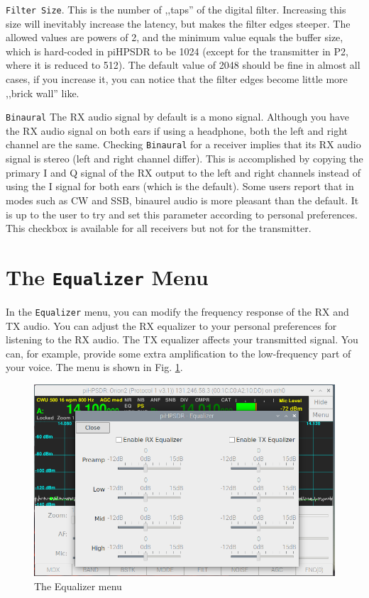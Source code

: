 \documentclass[12pt]{book}
\def\rett#1{\texttt{\color{red}#1}}
\def\bltt#1{\texttt{\color{blue}#1}}
\begin{document}
\rett{Filter Size}. This is the number of ,,taps'' of the digital
filter. Increasing this size will inevitably increase the latency,
but makes the filter edges steeper. The allowed values are
powers of 2, and the minimum value equals the buffer size, which
is hard-coded in piHPSDR to be 1024 (except for the transmitter in P2,
where it is reduced to 512). The default value of 2048 should be
fine in almost all cases, if you increase it, you can notice that
the filter edges become little more ,,brick wall'' like.

\rett{Binaural} The RX audio signal by default is a mono signal. Although
you have the RX audio signal on both ears if using a headphone, both the
left and right channel are the same. Checking \rett{Binaural} for a
receiver implies that its RX audio signal is stereo (left and right channel
differ). This is accomplished by copying the primary I and Q signal of the
RX output to the left and right channels instead of using the I signal
for both ears (which is the default). Some users report that in modes
such as CW and SSB, binaurel audio is more pleasant than the default.
It is up to the user to try and set this parameter according to personal
preferences. This checkbox is available for all receivers but not for the
transmitter.

\section{The \texttt{Equalizer} Menu}

In the \bltt{Equalizer} menu, you can modify the frequency response of
the RX and TX audio. You can adjust the RX equalizer to your personal
preferences for listening to the RX audio. The TX equalizer affects
your transmitted signal. You can, for example, provide some extra
amplification to the low-frequency part of your voice. The menu
is shown in Fig. \ref{fig:EqualizerMenu}.

\begin{figure}[ht]
\center
\includegraphics[width=12cm]{EqualizerMenu.png}
\caption{The Equalizer menu}
\label{fig:EqualizerMenu}
\end{figure}
\end{document}
